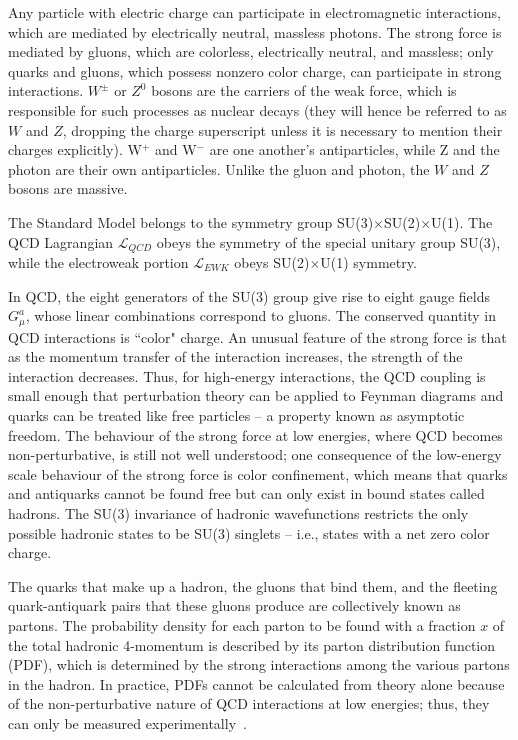 Any particle with electric charge can participate in electromagnetic interactions, which are mediated by electrically neutral, massless photons. The strong force is mediated by gluons, which are colorless, electrically neutral, and massless; only quarks and gluons, which possess nonzero color charge, can participate in strong interactions. $W^{\pm}$ or $Z^{0}$ bosons are the carriers of the weak force, which is responsible for such processes as nuclear decays (they will hence be referred to as $W$ and $Z$, dropping the charge superscript unless it is necessary to mention their charges explicitly). W$^{+}$ and W$^{-}$ are one another's antiparticles, while Z and the photon are their own antiparticles. Unlike the gluon and photon, the $W$ and $Z$ bosons are massive.

The Standard Model belongs to the symmetry group SU(3)$\times$SU(2)$\times$U(1). The QCD Lagrangian $\mathcal{L}_{QCD}$ obeys the symmetry of the special unitary group SU(3), while the electroweak portion $\mathcal{L}_{EWK}$ obeys SU(2)$\times$U(1) symmetry.

In QCD, the eight generators of the SU(3) group give rise to eight gauge fields $G^{a}_{\mu}$, whose linear combinations correspond to gluons. The conserved quantity in QCD interactions is ``color" charge. An unusual feature of the strong force is that as the momentum transfer of the interaction increases, the strength of the interaction decreases. Thus, for high-energy interactions, the QCD coupling is small enough that perturbation theory can be applied to Feynman diagrams and quarks can be treated like free particles -- a property known as asymptotic freedom. The behaviour of the strong force at low energies, where QCD becomes non-perturbative, is still not well understood; one consequence of the low-energy scale behaviour of the strong force is color confinement, which means that quarks and antiquarks cannot be found free but can only exist in bound states called hadrons. The SU(3) invariance of hadronic wavefunctions restricts the only possible hadronic states to be SU(3) singlets -- i.e., states with a net zero color charge.

The quarks that make up a hadron, the gluons that bind them, and the fleeting quark-antiquark pairs that these gluons produce are collectively known as partons. The probability density for each parton to be found with a fraction $x$ of the total hadronic 4-momentum is described by its parton distribution function (PDF), which is determined by the strong interactions among the various partons in the hadron. In practice, PDFs cannot be calculated from theory alone because of the non-perturbative nature of QCD interactions at low energies; thus, they can only be measured experimentally~\cite{BettiniPhysics}.

